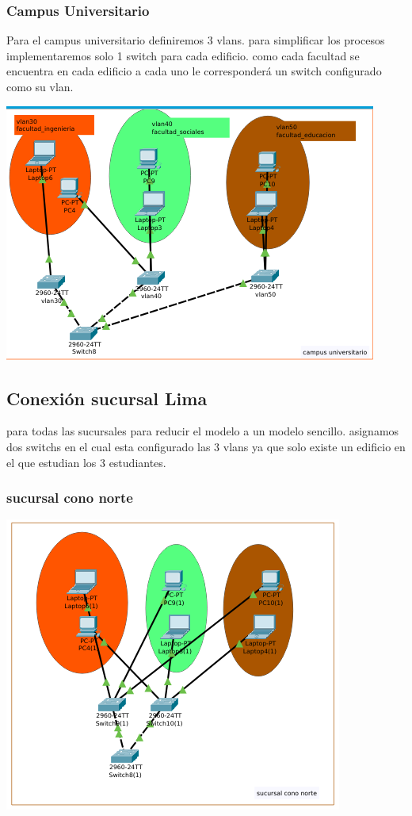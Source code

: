  \subsubsection{Campus Universitario}
 Para el campus universitario definiremos 3 vlans.
 para simplificar los procesos implementaremos solo 1 switch para cada edificio.
 como cada facultad se encuentra en cada edificio a cada uno le corresponder\'a un switch configurado como su vlan.
 
\includegraphics[scale=0.9]{img/campus.png} 
\subsection{Conexi\'on sucursal Lima}
para todas las sucursales para reducir el modelo a un modelo sencillo. asignamos dos switchs en el cual esta configurado las 3 vlans ya que solo existe un edificio en el que estudian los 3 estudiantes.
\subsubsection{sucursal cono norte}
\includegraphics[scale=1]{img/cononorte.png} 
